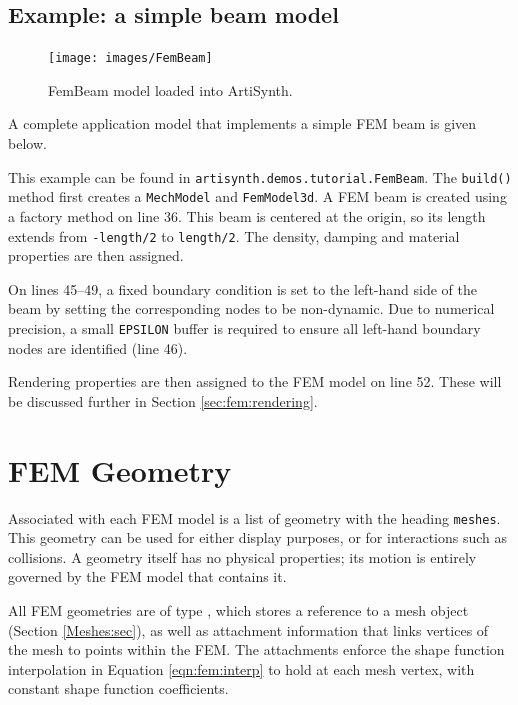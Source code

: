 \subsection{Example: a simple beam model}
\label{sec:fem:example:fembeam}

\begin{figure}[ht]
	\centering
	\texttt{[image: images/FemBeam]}
	\caption{FemBeam model loaded into ArtiSynth.}
	\label{fig:fem:beam}
\end{figure}

A complete application model that implements a simple FEM beam is given below.
\lstset{numbers=left}

\lstset{numbers=none}
This example can be found in {\tt artisynth.demos.tutorial.FemBeam}.  The 
{\tt build()} method first creates a {\tt MechModel} and {\tt FemModel3d}.
A FEM beam is created using a factory method on line 36.  This beam is
centered at the origin, so its length extends from {\tt-length/2} to 
{\tt length/2}.  The density, damping and material properties are then 
assigned.  

On lines 45--49, a fixed boundary condition is set to the left-hand side 
of the beam by setting the corresponding nodes to be non-dynamic.  Due to 
numerical precision, a small {\tt EPSILON} buffer is required to ensure 
all left-hand boundary nodes are identified (line 46).

Rendering properties are then assigned to the FEM model on line 52.  These 
will be discussed further in Section \ref{sec:fem:rendering}.

\section{FEM Geometry}
\label{sec:fem:geometry}

Associated with each FEM model is a list of geometry with the heading 
{\tt meshes}.  This geometry can be used for either display purposes, 
or for interactions such as collisions.  A geometry itself has no 
physical properties; its motion is entirely governed by the FEM model 
that contains it.  

All FEM geometries are of type , 
which stores a reference to a mesh object (Section \ref{Meshes:sec}), as well
as attachment information that links vertices of the mesh to points within
the FEM.  The attachments enforce the shape function interpolation in Equation
\eqref{eqn:fem:interp} to hold at each mesh vertex, with constant shape function
coefficients.


